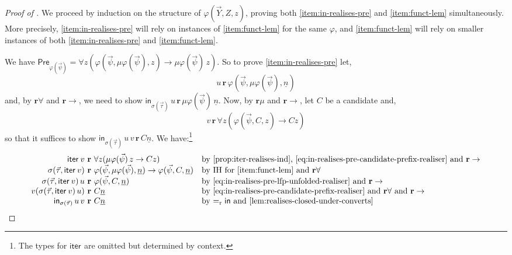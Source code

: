 \documentclass[10pt,a4paper]{amsart}
\theoremstyle{plain}
\theoremstyle{definition}
\renewcommand{\phi}{\varphi}
\theoremstyle{plain}
\theoremstyle{definition} %
\newcommand{\numeral}[1]{\underline{#1}}
\newcommand{\iter}[1]{\mathsf{iter}_{#1}}
\newcommand{\inj}{\mathsf{in}}
\newcommand{\injX}[1]{\inj_{#1}}
\newcommand{\reduction}{\mathrm{r}}
\newcommand{\converts}{=_{\reduction}}
\newcommand{\limp}{\to}
\newcommand{\preaxiom}{\mathsf{Pre}}
\newcommand{\realises}{\mathbf{r}}
\begin{document}
\begin{proof}
[Proof of ]
    We proceed by induction on the structure of $\phi(\vec Y,Z,z)$, proving both \eqref{item:in-realises-pre} and \eqref{item:funct-lem} simultaneously.
    More precisely, \eqref{item:in-realises-pre} will rely on instances of \eqref{item:funct-lem} for the same $\phi$, and \eqref{item:funct-lem} will rely on smaller instances of both \eqref{item:in-realises-pre} and \eqref{item:funct-lem}.


    We have $\preaxiom_{\phi(\vec \psi)} = \forall z (\phi(\vec \psi,\mu\phi(\vec \psi),z) \limp \mu\phi(\vec \psi)\, z)$.
    So to prove \eqref{item:in-realises-pre} let, 
    \begin{equation}
        \label{eq:in-realises-pre-lfp-unfolded-realiser}
        u\, \realises \, \phi(\vec \psi,\mu\phi(\vec \psi),\numeral n)
    \end{equation}
    and, by $\realises\forall $ and $\realises\limp$, we need to show $\injX{\sigma(\vec \tau)}\, u\, \realises\, \mu\phi(\vec \psi)\, \numeral n$.
    Now, by $\realises\mu$ and $\realises\limp$, let $C$ be a candidate and, 
    \begin{equation}
    \label{eq:in-realises-pre-candidate-prefix-realiser}
        v\, \realises \, \forall z (\phi(\vec \psi,C,z) \limp Cz)
    \end{equation} 
    so that it suffices to show $ \injX{\sigma(\vec \tau)}\, u\, v\, \realises\, C\numeral n$.
    We have:\footnote{The types for $\iter{}$ are omitted but determined by context.}
    \[
    \begin{array}{r@{\ \realises \ }ll}
         \iter{}\, v & \forall z (\mu\phi(\vec \psi)\, z \limp Cz) & \text{by \Cref{prop:iter-realises-ind}, \eqref{eq:in-realises-pre-candidate-prefix-realiser} and $\realises\limp$} \\
         \sigma (\vec \tau,\iter{} \, v ) & \phi(\vec \psi,\mu\phi(\vec \psi),\numeral n) \limp \phi(\vec \psi,C,\numeral n) & \text{by IH for \cref{item:funct-lem} and $\realises \forall$} \\
         \sigma (\vec \tau,\iter{} \, v ) \, u & \phi(\vec \psi,C,\numeral n) & \text{by \eqref{eq:in-realises-pre-lfp-unfolded-realiser} and $\realises \limp$} \\
         v (\sigma (\vec \tau,\iter{} \, v ) \, u) & C\numeral n & \text{by \eqref{eq:in-realises-pre-candidate-prefix-realiser} and $\realises \forall $ and $\realises\limp$} \\
         \injX{\sigma(\vec \tau)}\, u\, v & C\numeral n & \text{by $\converts \inj$ and \Cref{lem:realises-closed-under-converts}}
    \end{array}
    \]


\end{proof}
\end{document}
